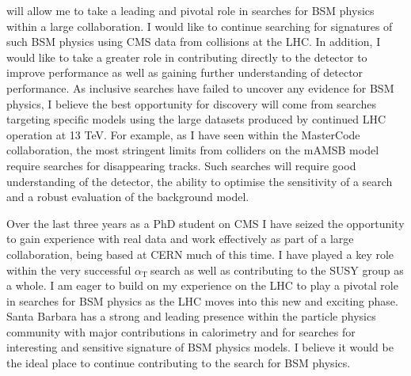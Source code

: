 \documentclass[11pt]{article}
\theoremstyle{plain} \numberwithin{equation}{section}
\theoremstyle{definition}
\DeclareRobustCommand{\alphat}{$\alpha_{\text{T}}~$}
\begin{document}
will allow me to take a leading and pivotal role in searches for BSM physics within a large collaboration.
I would like to continue searching for signatures of such BSM physics using CMS data from collisions at the LHC.
In addition, I would like to take a greater role in contributing directly to the detector to improve performance
as well as gaining further understanding of detector performance. As inclusive searches have failed 
to uncover any evidence for BSM physics, I believe the best opportunity for discovery will 
come from searches targeting specific models using the large datasets produced 
by continued LHC operation at 13 TeV. For example, as I have seen within 
the MasterCode collaboration, the most stringent limits from colliders on the mAMSB 
model require searches for disappearing tracks. Such searches will require good understanding of the detector,
the ability to optimise the sensitivity of a search and a robust evaluation of the background model.

Over the last three years as a PhD student on CMS I have seized the opportunity to gain experience with real data
and work effectively as part of a large collaboration, being based at CERN much of this time. I have played 
a key role within the very successful \alphat search as well as contributing to the SUSY group as a whole.
I am eager to build on my experience on the LHC to play a pivotal role in searches for BSM physics as the LHC
moves into this new and exciting phase. Santa Barbara has a strong and leading presence within the particle
physics community with major contributions in calorimetry and for searches for interesting and sensitive signature
of BSM physics models. I believe it would be the ideal place to continue contributing to the search for BSM physics.

\end{document}
